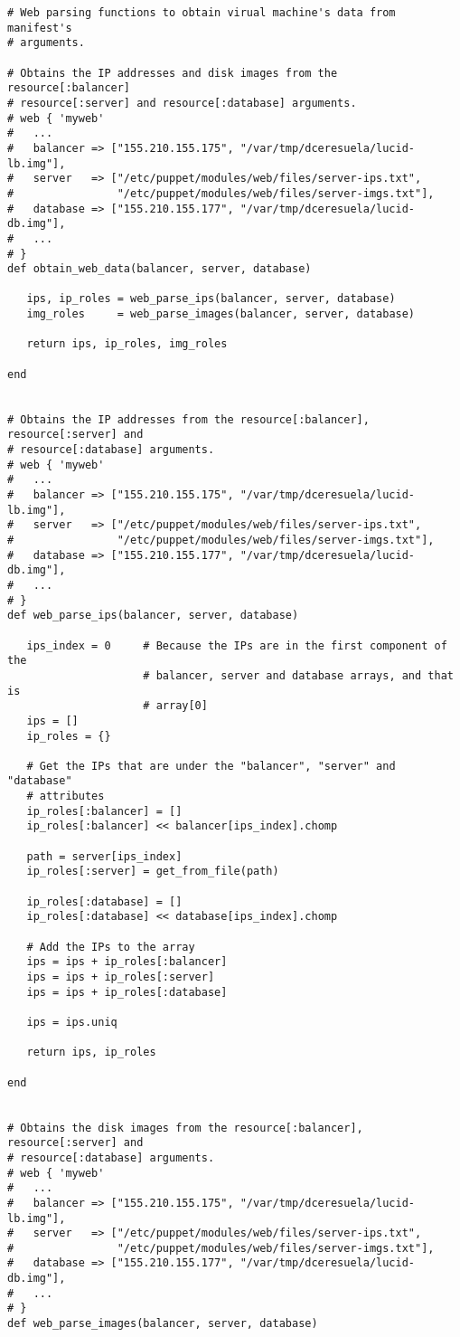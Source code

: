 \begin{lstlisting}
# Web parsing functions to obtain virual machine's data from manifest's
# arguments.

# Obtains the IP addresses and disk images from the resource[:balancer]
# resource[:server] and resource[:database] arguments.
# web { 'myweb'
#   ...
#   balancer => ["155.210.155.175", "/var/tmp/dceresuela/lucid-lb.img"],
#   server   => ["/etc/puppet/modules/web/files/server-ips.txt",
#                "/etc/puppet/modules/web/files/server-imgs.txt"],
#   database => ["155.210.155.177", "/var/tmp/dceresuela/lucid-db.img"],
#   ...
# }
def obtain_web_data(balancer, server, database)

   ips, ip_roles = web_parse_ips(balancer, server, database)
   img_roles     = web_parse_images(balancer, server, database)
   
   return ips, ip_roles, img_roles

end


# Obtains the IP addresses from the resource[:balancer], resource[:server] and
# resource[:database] arguments.
# web { 'myweb'
#   ...
#   balancer => ["155.210.155.175", "/var/tmp/dceresuela/lucid-lb.img"],
#   server   => ["/etc/puppet/modules/web/files/server-ips.txt",
#                "/etc/puppet/modules/web/files/server-imgs.txt"],
#   database => ["155.210.155.177", "/var/tmp/dceresuela/lucid-db.img"],
#   ...
# }
def web_parse_ips(balancer, server, database)

   ips_index = 0     # Because the IPs are in the first component of the
                     # balancer, server and database arrays, and that is
                     # array[0]
   ips = []
   ip_roles = {}
   
   # Get the IPs that are under the "balancer", "server" and "database"
   # attributes
   ip_roles[:balancer] = []
   ip_roles[:balancer] << balancer[ips_index].chomp
   
   path = server[ips_index]
   ip_roles[:server] = get_from_file(path)
   
   ip_roles[:database] = []
   ip_roles[:database] << database[ips_index].chomp
   
   # Add the IPs to the array
   ips = ips + ip_roles[:balancer]
   ips = ips + ip_roles[:server]
   ips = ips + ip_roles[:database]
   
   ips = ips.uniq
   
   return ips, ip_roles
   
end


# Obtains the disk images from the resource[:balancer], resource[:server] and
# resource[:database] arguments.
# web { 'myweb'
#   ...
#   balancer => ["155.210.155.175", "/var/tmp/dceresuela/lucid-lb.img"],
#   server   => ["/etc/puppet/modules/web/files/server-ips.txt",
#                "/etc/puppet/modules/web/files/server-imgs.txt"],
#   database => ["155.210.155.177", "/var/tmp/dceresuela/lucid-db.img"],
#   ...
# }
def web_parse_images(balancer, server, database)


\end{lstlisting}
